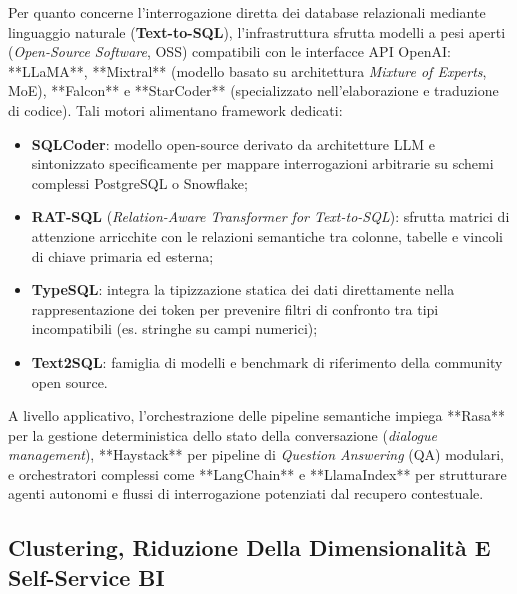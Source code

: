 \documentclass[11pt, a4paper]{article}
\begin{document}
Per quanto concerne l'interrogazione diretta dei database relazionali mediante linguaggio naturale (\textbf{Text-to-SQL}), l'infrastruttura sfrutta modelli a pesi aperti (\emph{Open-Source Software}, OSS) compatibili con le interfacce API OpenAI: **LLaMA**, **Mixtral** (modello basato su architettura \emph{Mixture of Experts}, MoE), **Falcon** e **StarCoder** (specializzato nell'elaborazione e traduzione di codice). Tali motori alimentano framework dedicati:
\begin{itemize}
    \item \textbf{SQLCoder}: modello open-source derivato da architetture LLM e sintonizzato specificamente per mappare interrogazioni arbitrarie su schemi complessi PostgreSQL o Snowflake;
    \item \textbf{RAT-SQL} (\emph{Relation-Aware Transformer for Text-to-SQL}): sfrutta matrici di attenzione arricchite con le relazioni semantiche tra colonne, tabelle e vincoli di chiave primaria ed esterna;
    \item \textbf{TypeSQL}: integra la tipizzazione statica dei dati direttamente nella rappresentazione dei token per prevenire filtri di confronto tra tipi incompatibili (es. stringhe su campi numerici);
    \item \textbf{Text2SQL}: famiglia di modelli e benchmark di riferimento della community open source.
\end{itemize}

A livello applicativo, l'orchestrazione delle pipeline semantiche impiega **Rasa** per la gestione deterministica dello stato della conversazione (\emph{dialogue management}), **Haystack** per pipeline di \emph{Question Answering} (QA) modulari, e orchestratori complessi come **LangChain** e **LlamaIndex** per strutturare agenti autonomi e flussi di interrogazione potenziati dal recupero contestuale.


\subsection{Clustering, Riduzione Della Dimensionalità E Self-Service BI}
\end{document}
